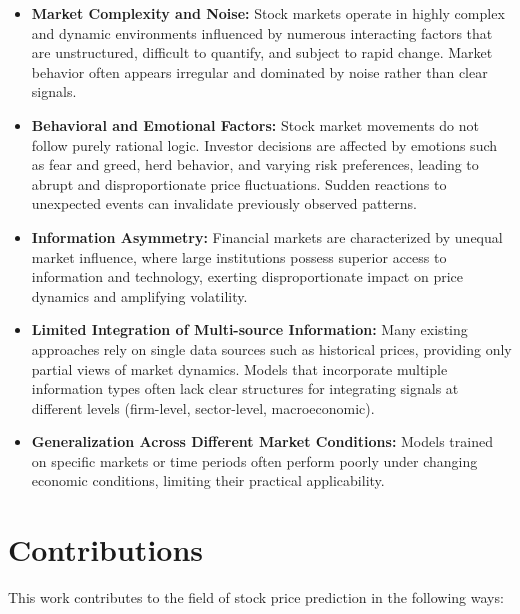 \begin{itemize}
    \item \textbf{Market Complexity and Noise:} Stock markets operate in highly complex and dynamic environments influenced by numerous interacting factors that are unstructured, difficult to quantify, and subject to rapid change. Market behavior often appears irregular and dominated by noise rather than clear signals.
    
    \item \textbf{Behavioral and Emotional Factors:} Stock market movements do not follow purely rational logic. Investor decisions are affected by emotions such as fear and greed, herd behavior, and varying risk preferences, leading to abrupt and disproportionate price fluctuations. Sudden reactions to unexpected events can invalidate previously observed patterns.
    
    \item \textbf{Information Asymmetry:} Financial markets are characterized by unequal market influence, where large institutions possess superior access to information and technology, exerting disproportionate impact on price dynamics and amplifying volatility.
    
    \item \textbf{Limited Integration of Multi-source Information:} Many existing approaches rely on single data sources such as historical prices, providing only partial views of market dynamics. Models that incorporate multiple information types often lack clear structures for integrating signals at different levels (firm-level, sector-level, macroeconomic).
    
    \item \textbf{Generalization Across Different Market Conditions:} Models trained on specific markets or time periods often perform poorly under changing economic conditions, limiting their practical applicability.
\end{itemize}

\section{Contributions}

This work contributes to the field of stock price prediction in the following ways:

